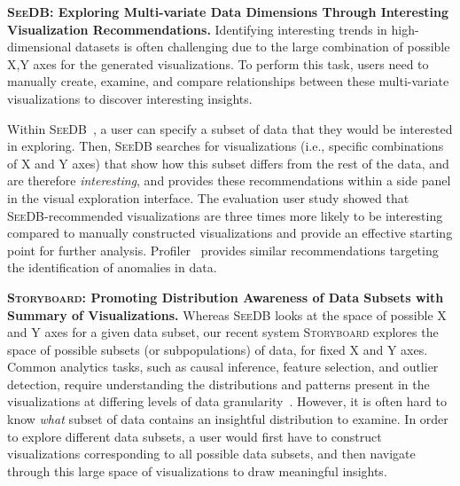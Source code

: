 \documentclass[11pt]{article}
\newcommand{\techreport}[1]{}
\newcommand{\stitle}[1]{\par\noindent\textbf{#1}}
\newcommand{\ccut}[1]{} %
\newcommand{\sbd}{\textsc{Storyboard}\xspace}
\newcommand{\seedb}{\textsc{SeeDB}\xspace}
\begin{document}
\smallskip
\stitle{\seedb: Exploring Multi-variate Data Dimensions 
Through Interesting Visualization Recommendations.}
Identifying interesting trends in 
high-dimensional datasets is often challenging 
due to the large combination of possible X,Y axes 
for the generated visualizations. 
To perform this task, users need to manually create, examine, and compare relationships between these multi-variate visualizations 
to discover interesting insights. 

\par Within \seedb~\cite{Vartak2015},
a user can specify a subset of data 
that they would be interested in exploring. 
Then, \seedb searches for visualizations
(i.e., specific combinations of X and Y axes)
that show how this subset differs from the rest 
of the data, and are
therefore {\em interesting},
and provides these recommendations within a side panel
in the visual exploration interface.
The evaluation user study showed that 
\seedb-recommended visualizations are 
three times more likely to be interesting 
compared to manually constructed visualizations 
and provide an effective starting point for further analysis.
Profiler~\cite{Kandel2012} provides similar
recommendations targeting the identification of
anomalies in data.


\smallskip
\stitle{\sbd: Promoting Distribution Awareness of Data Subsets with Summary of Visualizations.}
Whereas \seedb looks at the space of possible X and Y axes for a given data subset, our recent system \sbd explores 
the space of possible subsets 
(or subpopulations) of data,
for fixed X and Y axes.
Common analytics tasks, 
such as causal inference, 
feature selection, and outlier detection, 
require understanding the distributions and 
patterns present in the visualizations 
at differing levels of data granularity~\cite{Anand2015,Heer2012,Wu2013}. 
However, it is often hard to know \textit{what} 
subset of data contains an 
insightful distribution to examine. 
In order to explore different data subsets, 
a user would first have to 
construct visualizations 
corresponding to all possible data subsets, 
and then navigate through this large space of 
visualizations to draw meaningful insights. 
\ccut{While there are some related work in database literature in constructing informative summaries that help guide users through the complex schema of object-oriented databases\cite{McHugh1997,Yu2006}, these are often focused on table and attribute level information, rather than information about derived from the actual data distributions.} 
\techreport{The lack of a systematic way 
to do this makes the process of manually exploring distributions from all possible data subsets tedious and inefficient~\cite{Sarawagi1998,Sarawagi2000}.}
\end{document}
